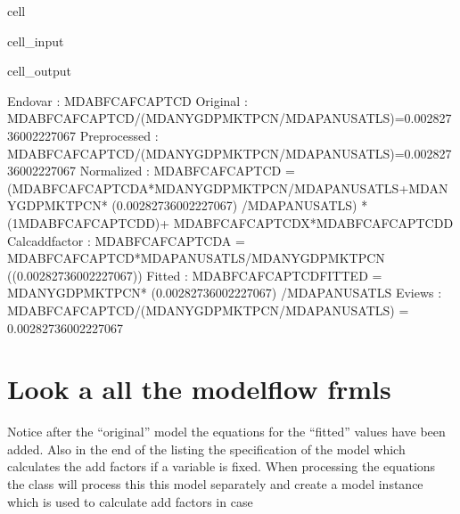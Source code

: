\documentclass[letterpaper,10pt,english]{jupyterBook}
\begin{document}
\begin{sphinxuseclass}{cell}\begin{sphinxVerbatimInput}

\begin{sphinxuseclass}{cell_input}
\begin{sphinxVerbatim}[commandchars=\\\{\}]
\PYG{p}{[}\PYG{p}{]}
\end{sphinxVerbatim}

\end{sphinxuseclass}\end{sphinxVerbatimInput}
\begin{sphinxVerbatimOutput}

\begin{sphinxuseclass}{cell_output}
\begin{sphinxVerbatim}[commandchars=\\\{\}]
Endo\PYGZus{}var        : MDABFCAFCAPTCD
Original        : MDABFCAFCAPTCD/(MDANYGDPMKTPCN/MDAPANUSATLS)=0.00282736002227067
Preprocessed    : MDABFCAFCAPTCD/(MDANYGDPMKTPCN/MDAPANUSATLS)=0.00282736002227067
Normalized      : MDABFCAFCAPTCD = (MDABFCAFCAPTCD\PYGZus{}A*MDANYGDPMKTPCN/MDAPANUSATLS+MDANYGDPMKTPCN* (0.00282736002227067) /MDAPANUSATLS) * (1\PYGZhy{}MDABFCAFCAPTCD\PYGZus{}D)+ MDABFCAFCAPTCD\PYGZus{}X*MDABFCAFCAPTCD\PYGZus{}D 
Calc\PYGZus{}add\PYGZus{}factor : MDABFCAFCAPTCD\PYGZus{}A = MDABFCAFCAPTCD*MDAPANUSATLS/MDANYGDPMKTPCN\PYGZhy{} ((0.00282736002227067)) 
Fitted          : MDABFCAFCAPTCD\PYGZus{}FITTED = MDANYGDPMKTPCN* (0.00282736002227067) /MDAPANUSATLS
Eviews          : MDABFCAFCAPTCD/(MDANYGDPMKTPCN/MDAPANUSATLS) = 0.00282736002227067
\end{sphinxVerbatim}

\end{sphinxuseclass}\end{sphinxVerbatimOutput}

\end{sphinxuseclass}

\section{Look a all the modelflow frmls}
\label{\detokenize{content/howto/onboard/eviews/onboard one model from  wf1:look-a-all-the-modelflow-frmls}}
\sphinxAtStartPar
Notice after the “original” model the equations for the “fitted” values have been added. 
Also in the end of the listing the specification of the model which calculates the add factors if a variable is fixed. When processing the equations the  class will process this this model separately and create a model instance
which is used to calculate add factors in case
\end{document}
